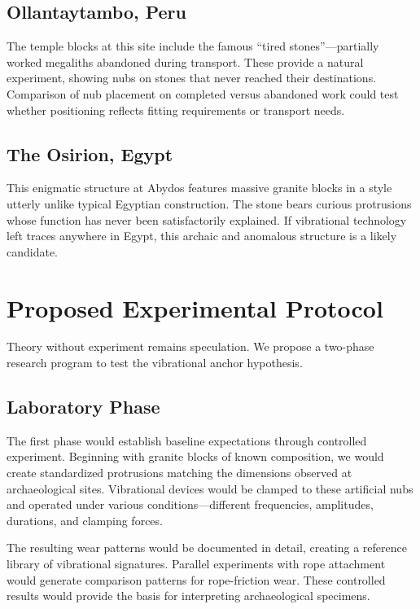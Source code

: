 \documentclass[11pt]{article}
\begin{document}
\subsection{Ollantaytambo, Peru}

The temple blocks at this site include the famous ``tired stones''—partially worked megaliths abandoned during transport. These provide a natural experiment, showing nubs on stones that never reached their destinations. Comparison of nub placement on completed versus abandoned work could test whether positioning reflects fitting requirements or transport needs.

\subsection{The Osirion, Egypt}

This enigmatic structure at Abydos features massive granite blocks in a style utterly unlike typical Egyptian construction. The stone bears curious protrusions whose function has never been satisfactorily explained. If vibrational technology left traces anywhere in Egypt, this archaic and anomalous structure is a likely candidate.

\section{Proposed Experimental Protocol}

Theory without experiment remains speculation. We propose a two-phase research program to test the vibrational anchor hypothesis.

\subsection{Laboratory Phase}

The first phase would establish baseline expectations through controlled experiment. Beginning with granite blocks of known composition, we would create standardized protrusions matching the dimensions observed at archaeological sites. Vibrational devices would be clamped to these artificial nubs and operated under various conditions—different frequencies, amplitudes, durations, and clamping forces.

The resulting wear patterns would be documented in detail, creating a reference library of vibrational signatures. Parallel experiments with rope attachment would generate comparison patterns for rope-friction wear. These controlled results would provide the basis for interpreting archaeological specimens.
\end{document}
